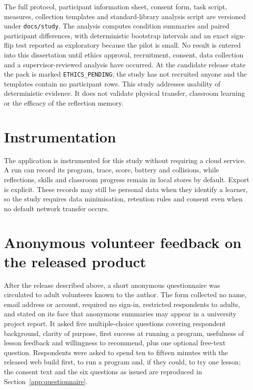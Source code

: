 \documentclass[11pt,a4paper]{report}
\newif\ifhumanfeedback
\begin{document}
The full protocol, participant information sheet, consent form, task script, measures, collection templates and standard-library analysis script are versioned under \texttt{docs/study}. The analysis computes condition summaries and paired participant differences, with deterministic bootstrap intervals and an exact sign-flip test reported as exploratory because the pilot is small. No result is entered into this dissertation until ethics approval, recruitment, consent, data collection and a supervisor-reviewed analysis have occurred. At the candidate release state the pack is marked \texttt{ETHICS\_PENDING}; the study has not recruited anyone and the templates contain no participant rows. This study addresses usability of deterministic evidence. It does not validate physical transfer, classroom learning or the efficacy of the reflection memory.

\section{Instrumentation}
The application is instrumented for this study without requiring a cloud service. A run can record its program, trace, score, battery and collisions, while reflections, skills and classroom progress remain in local stores by default. Export is explicit. These records may still be personal data when they identify a learner, so the study requires data minimisation, retention rules and consent even when no default network transfer occurs.

\ifhumanfeedback
\section{Anonymous volunteer feedback on the released product}
\label{sec:volunteerfeedback}
After the release described above, a short anonymous questionnaire was circulated to adult volunteers known to the author. The form collected no name, email address or account, required no sign-in, restricted respondents to adults, and stated on its face that anonymous summaries may appear in a university project report. It asked five multiple-choice questions covering respondent background, clarity of purpose, first success at running a program, usefulness of lesson feedback and willingness to recommend, plus one optional free-text question. Respondents were asked to spend ten to fifteen minutes with the released web build first, to run a program and, if they could, to try one lesson; the consent text and the six questions as issued are reproduced in Section~\ref{app:questionnaire}.
\end{document}
